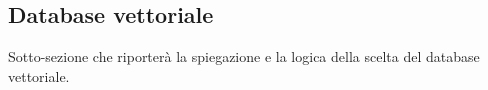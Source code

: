 \subsection{Database vettoriale}

Sotto-sezione che riporterà la spiegazione e la logica della scelta del database vettoriale.